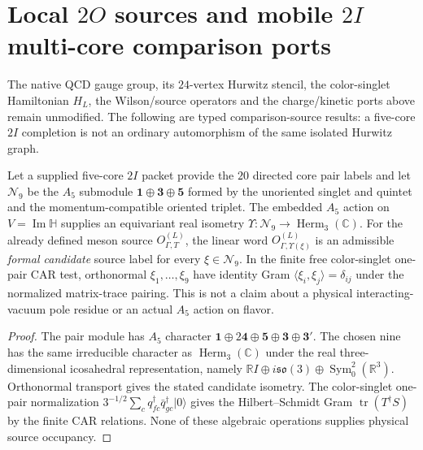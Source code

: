 \documentclass[12pt,a4paper]{article}
\begin{document}
\section{Local $2O$ sources and mobile $2I$ multi-core comparison ports}
\label{p10:sec:v1173-octahedral-icosahedral-source-ports}
The native QCD gauge group, its $24$-vertex Hurwitz stencil, the
color-singlet Hamiltonian $H_L$, the Wilson/source operators and
the charge/kinetic ports above remain unmodified.  The following
are typed comparison-source results: a five-core $2I$ completion
is not an ordinary automorphism of the same isolated Hurwitz graph.

\begin{proposition}
\label{p10:prop:v1173-formal-two-core-meson-port}
Let a supplied five-core $2I$ packet provide the $20$ directed core
pair labels and let $\mathcal N_9$ be the $A_5$ submodule
$\mathbf1\oplus\mathbf3\oplus\mathbf5$ formed by the unoriented
singlet and quintet and the momentum-compatible oriented triplet.
The embedded $A_5$ action on $V=\operatorname{Im}\mathbb H$ supplies
an equivariant real isometry
$\Upsilon:\mathcal N_9\to\operatorname{Herm}_3(\mathbb C)$.
For the already defined meson source $O_{\Gamma,T}^{(L)}$, the
linear word $O_{\Gamma,\Upsilon(\xi)}^{(L)}$ is an admissible
\emph{formal candidate} source label for every $\xi\in\mathcal N_9$.
In the finite free color-singlet one-pair CAR test, orthonormal
$\xi_1,\ldots,\xi_9$ have identity Gram
$\langle\xi_i,\xi_j\rangle=\delta_{ij}$ under the normalized
matrix-trace pairing.  This is not a claim about a physical
interacting-vacuum pole residue or an actual $A_5$ action on flavor.
\end{proposition}
\begin{proof}
The pair module has $A_5$ character
$\mathbf1\oplus2\mathbf4\oplus\mathbf5\oplus\mathbf3\oplus\mathbf3'$.
The chosen nine has the same irreducible character as
$\operatorname{Herm}_3(\mathbb C)$ under the real
three-dimensional icosahedral representation, namely
$\mathbb RI\oplus i\mathfrak{so}(3)\oplus
\operatorname{Sym}_0^2(\mathbb R^3)$.
Orthonormal transport gives the stated candidate isometry.
The color-singlet one-pair normalization
$3^{-1/2}\sum_c q_{fc}^\dagger\bar q_{gc}^\dagger|0\rangle$
gives the Hilbert--Schmidt Gram $\operatorname{tr}(T^\dagger S)$
by the finite CAR relations.  None of these algebraic operations
supplies physical source occupancy.
\end{proof}
\end{document}
